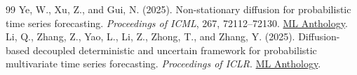 \documentclass[11pt]{article}
\begin{document}
\begin{thebibliography}{99}
 Ye, W., Xu, Z., and Gui, N. (2025). Non-stationary diffusion for probabilistic time series forecasting. \emph{Proceedings of ICML}, 267, 72112--72130. \href{https://mlanthology.org/icml/2025/ye2025icml-nonstationary/}{ML Anthology}.
 Li, Q., Zhang, Z., Yao, L., Li, Z., Zhong, T., and Zhang, Y. (2025). Diffusion-based decoupled deterministic and uncertain framework for probabilistic multivariate time series forecasting. \emph{Proceedings of ICLR}. \href{https://mlanthology.org/iclr/2025/li2025iclr-diffusionbased/}{ML Anthology}.
\end{thebibliography}
\end{document}
